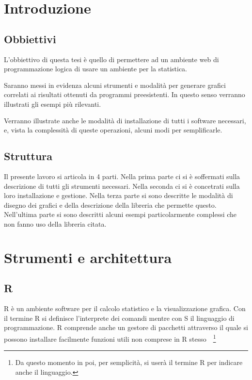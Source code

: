\documentclass[10pt,titlepage,twoside,a4paper]{report}
\begin{document}
\restoregeometry


\newpage
\tableofcontents
\newpage
\listoffigures
\newpage
\listoflistings
\cleardoublepage





\chapter{Introduzione}
\label{ch:introduzione}
    \section{Obbiettivi}
L'obbiettivo di questa tesi è quello di permettere ad un ambiente web di 
programmazione logica di usare un ambiente per la statistica.

Saranno messi in evidenza alcuni strumenti e modalità per generare grafici 
correlati ai risultati ottenuti da programmi preesistenti. In questo senso 
verranno illustrati gli esempi più rilevanti.

Verranno illustrate anche le modalità di installazione di tutti i software
necessari, e, vista la complessità di queste operazioni, alcuni modi per 
semplificarle.

    \section{Struttura}
Il presente lavoro si articola in 4 parti. Nella prima parte ci si è 
soffermati sulla descrizione di tutti gli strumenti necessari. Nella seconda ci 
si è concetrati sulla loro installazione e gestione. Nella terza parte si sono 
descritte le modalità di disegno dei grafici e della descrizione della 
libreria che permette questo. Nell'ultima parte si sono descritti alcuni esempi 
particolarmente complessi che non fanno uso della libreria citata.




\chapter{Strumenti e architettura}

    \section{R}
R è un ambiente software per il calcolo statistico e la 
visualizzazione grafica. Con il termine R si definisce 
l'interprete dei comandi mentre con S il linguaggio di programmazione. R 
comprende anche un gestore di pacchetti attraverso il quale si possono 
installare facilmente funzioni utili non comprese in R 
stesso~\cite{rDefinition}~\footnote{Da questo momento in poi, per semplicità, 
si userà il termine R per indicare anche il linguaggio.}
\end{document}
